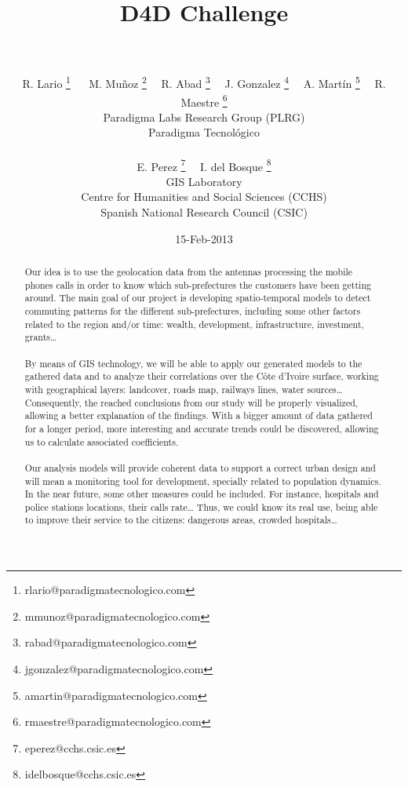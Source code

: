 \documentclass[a4paper,11pt]{article}
\begin{document}
\title{{\huge D4D Challenge} \\  \\ }

\author{{
              R. Lario  \footnote{rlario@paradigmatecnologico.com} \ \  %
				M. Muñoz  \footnote{mmunoz@paradigmatecnologico.com} \ \
				R. Abad  \footnote{rabad@paradigmatecnologico.com}  \ \
				J. Gonzalez  \footnote{jgonzalez@paradigmatecnologico.com}  \ \
				A. Martín  \footnote{amartin@paradigmatecnologico.com}  \ \
				R. Maestre  \footnote{rmaestre@paradigmatecnologico.com} 
				\\\small Paradigma Labs Research Group (PLRG) \\\small Paradigma Tecnológico\\ \\
				E. Perez \footnote{eperez@cchs.csic.es}  \ \
				I. del Bosque  \footnote{idelbosque@cchs.csic.es} 
				\\\small GIS Laboratory \\\small Centre for Humanities and Social Sciences (CCHS) \\\small Spanish National Research Council (CSIC)
				}}

\date{15-Feb-2013}
\maketitle

\begin{abstract} 
Our idea is to use the geolocation data from the antennas processing the mobile phones calls in order to know which sub-prefectures the customers have been getting around. The main goal of our project is developing spatio-temporal models to detect commuting patterns for the different sub-prefectures, including some other factors related to the region and/or time: wealth, development, infrastructure, investment, grants…
\\
\\
By means of GIS technology, we will be able to apply our generated models to the gathered data and to analyze their correlations over the Côte d’Ivoire surface, working with geographical layers: landcover, roads map, railways lines, water sources… Consequently, the reached conclusions from our study will be properly visualized, allowing a better explanation of the findings. With a bigger amount of data gathered for a longer period, more interesting and accurate trends could be discovered, allowing us to calculate associated coefficients.
\\
\\
Our analysis models will provide coherent data to support a correct urban design and will mean a monitoring tool for development, specially related to population dynamics.
In the near future, some other measures could be included. For instance, hospitals and police stations locations, their calls rate… Thus, we could know its real use, being able to improve their service to the citizens: dangerous areas, crowded hospitals…
\end{abstract}
\end{document}
